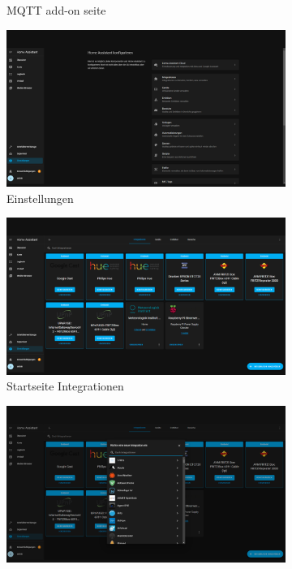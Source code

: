 \begin{figure}[H]
\begin{subfigure}{.5\linewidth}
        \caption{MQTT add-on seite}
        \label{fig:ha7}
    \end{subfigure}
    \begin{subfigure}{.5\linewidth}
        \includegraphics[width=1\textwidth]{img/HA9.png}
        \caption{Einstellungen}
        \label{fig:ha8}
    \end{subfigure}
    \begin{subfigure}{.5\linewidth}
        \includegraphics[width=1\textwidth]{img/HA12.png}
        \caption{Startseite Integrationen }
        \label{fig:ha11}
    \end{subfigure}
    \begin{subfigure}{.5\linewidth}
        \includegraphics[width=1\textwidth]{img/HA13.png}

\end{subfigure}
\end{figure}

